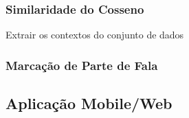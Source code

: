\subsubsection{Similaridade do Cosseno}\label{subsubsec:cossine_similarity}

Extrair os contextos do conjunto de dados


\subsubsection{Marcação de Parte de Fala}\label{subsubsec:pos_tagging}


\subsection{Aplicação Mobile/Web}\label{subsec:app}

